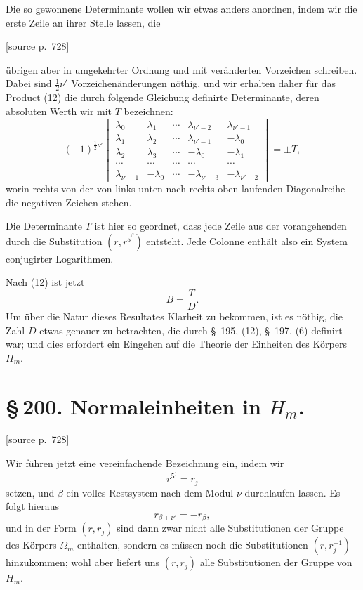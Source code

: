 \documentclass[11pt]{article}
\newcommand{\srcpage}[1]{\par\medskip\noindent\textsf{[source p.~#1]}\par\smallskip}
\begin{document}
Die so gewonnene Determinante wollen wir etwas anders anordnen, indem wir die erste Zeile an ihrer Stelle lassen, die
\srcpage{728}
übrigen aber in umgekehrter Ordnung und mit veränderten Vorzeichen schreiben. Dabei sind $\frac12\nu'$ Vorzeichenänderungen nöthig, und wir erhalten daher für das Product (12) die durch folgende Gleichung definirte Determinante, deren absoluten Werth wir mit $T$ bezeichnen:
\begin{equation}
(-1)^{\frac12\nu'}
\begin{vmatrix}
\lambda_0&\lambda_1&\cdots&\lambda_{\nu'-2}&\lambda_{\nu'-1}\\
\lambda_1&\lambda_2&\cdots&\lambda_{\nu'-1}&-\lambda_0\\
\lambda_2&\lambda_3&\cdots&-\lambda_0&-\lambda_1\\
\cdots&\cdots&\cdots&\cdots&\cdots\\
\lambda_{\nu'-1}&-\lambda_0&\cdots&-\lambda_{\nu'-3}&-\lambda_{\nu'-2}
\end{vmatrix}=\pm T,
\tag{14}
\end{equation}
worin rechts von der von links unten nach rechts oben laufenden Diagonalreihe die negativen Zeichen stehen.

Die Determinante $T$ ist hier so geordnet, dass jede Zeile aus der vorangehenden durch die Substitution $(r,r^{5^\beta})$ entsteht. Jede Colonne enthält also ein System conjugirter Logarithmen.

Nach (12) ist jetzt
\begin{equation}
B=\frac{T}{D}.
\tag{15}
\end{equation}
Um über die Natur dieses Resultates Klarheit zu bekommen, ist es nöthig, die Zahl $D$ etwas genauer zu betrachten, die durch \S~195, (12), \S~197, (6) definirt war; und dies erfordert ein Eingehen auf die Theorie der Einheiten des Körpers $H_m$.




\section*{\S\,200. Normaleinheiten in $H_m$.}

\srcpage{728}
Wir führen jetzt eine vereinfachende Bezeichnung ein, indem wir
\begin{equation}
r^{5^j}=r_j
\tag{1}
\end{equation}
setzen, und $\beta$ ein volles Restsystem nach dem Modul $\nu$ durchlaufen lassen. Es folgt hieraus
\begin{equation}
r_{\beta+\nu'}=-r_\beta,
\tag{2}
\end{equation}
und in der Form $(r,r_j)$ sind dann zwar nicht alle Substitutionen der Gruppe des Körpers $\Omega_m$ enthalten, sondern es müssen noch die Substitutionen $(r,r_j^{-1})$ hinzukommen; wohl aber liefert uns $(r,r_j)$ alle Substitutionen der Gruppe von $H_m$.
\end{document}
